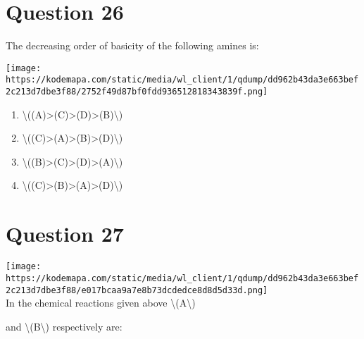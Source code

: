 \documentclass{article}
\begin{document}
\section*{Question 26}
The decreasing order of basicity of the following amines is:



\texttt{[image: https://kodemapa.com/static/media/wl\_client/1/qdump/dd962b43da3e663bef2c213d7dbe3f88/2752f49d87bf0fdd936512818343839f.png]}\\


\begin{enumerate}[label=(\alph*)]
\item \textbackslash((A)\textgreater(C)\textgreater(D)\textgreater(B)\textbackslash)


\item \textbackslash((C)\textgreater(A)\textgreater(B)\textgreater(D)\textbackslash)


\item \textbackslash((B)\textgreater(C)\textgreater(D)\textgreater(A)\textbackslash)


\item \textbackslash((C)\textgreater(B)\textgreater(A)\textgreater(D)\textbackslash)


\end{enumerate}
\newpage
\section*{Question 27}
\texttt{[image: https://kodemapa.com/static/media/wl\_client/1/qdump/dd962b43da3e663bef2c213d7dbe3f88/e017bcaa9a7e8b73dcdedce8d8d5d33d.png]}\\



In the chemical reactions given above \textbackslash(A\textbackslash)

and \textbackslash(B\textbackslash) respectively are:
\end{document}
